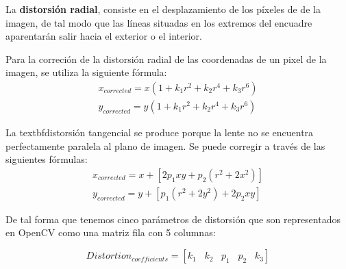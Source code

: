 La \textbf{distorsión radial}, consiste en el desplazamiento de los píxeles de de la imagen, de tal modo que las líneas situadas en los extremos del encuadre aparentarán salir hacia el exterior o el interior.   

Para la correción de la distorsión radial de las coordenadas de un pixel de la imagen, se utiliza la siguiente fórmula:
\begin{equation}
  \begin{split}
    x_{corrected} = x(1 + k_1 r^2 + k_2 r^4 + k_3 r^6)  \\
    y_{corrected} = y(1 + k_1 r^2 + k_2 r^4 + k_3 r^6)
  \end{split}
\end{equation}

La textbf{distorsión tangencial} se produce porque la lente no se encuentra perfectamente paralela al plano de imagen. Se puede corregir a través de las siguientes fórmulas:
\begin{equation}
  \begin{split}
    x_{corrected} = x + [ 2p_1xy + p_2(r^2+2x^2)] \\ 
    y_{corrected} = y + [ p_1(r^2+ 2y^2)+ 2p_2xy]
  \end{split}
\end{equation}

De tal forma que tenemos cinco parámetros de distorsión que son representados en OpenCV como una matriz fila con 5 columnas: 

\begin{equation}
  Distortion_{coefficients} = [k_1 \hspace{10pt} k_2 \hspace{10pt} p_1 \hspace{10pt} p_2 \hspace{10pt} k_3]
\end{equation}


